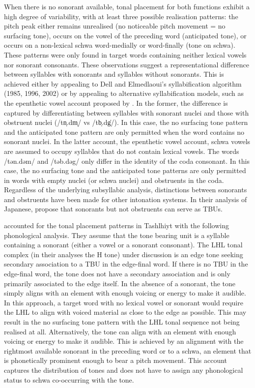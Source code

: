 When there is no sonorant available, tonal placement for both functions exhibit a high degree of variability, with at least three possible realisation patterns: the pitch peak either remains unrealised (no noticeable pitch movement = no surfacing tone), occurs on the vowel of the preceding word (anticipated tone), or occurs on a non-lexical schwa word-medially or word-finally (tone on schwa). These patterns were only found in target words containing neither lexical vowels nor sonorant consonants. These observations suggest a representational difference between syllables with sonorants and syllables without sonorants. This is achieved either by appealing to Dell and Elmedlaoui’s syllabification algorithm (1985, 1996, 2002) or by appealing to alternative syllabification models, such as the epenthetic vowel account proposed by \citet{Coleman2001}. In the former, the difference is captured by differentiating between syllables with sonorant nuclei and those with obstruent nuclei (/tn̩.dm̩/ vs /tb̩.dg̍/). In this case, the no surfacing tone pattern and the anticipated tone pattern are only permitted when the word contains no sonorant nuclei. In the latter account, the epenthetic vowel account, schwa vowels are assumed to occupy syllables that do not contain lexical vowels. The words /tən.dəm/ and /təb.dəg/ only differ in the identity of the coda consonant. In this case, the no surfacing tone and the anticipated tone patterns are only permitted in words with empty nuclei (or schwa nuclei) and obstruents in the coda. Regardless of the underlying subsyllabic analysis, distinctions between sonorants and obstruents have been made for other intonation systems. In their analysis of Japanese, \citet{PierrBeck1988} propose that sonorants but not obstruents can serve as TBUs.

\citet{Grice.etal2015tash} accounted for the tonal placement patterns in Tashlhiyt with the following phonological analysis. They assume that the tone bearing unit is a syllable containing a sonorant (either a vowel or a sonorant consonant). The LHL tonal complex (in their analyses the H tone) under discussion is an edge tone seeking secondary association to a TBU in the edge-final word. If there is no TBU in the edge-final word, the tone does not have a secondary association and is only primarily associated to the edge itself. In the absence of a sonorant, the tone simply aligns with an element with enough voicing or energy to make it audible. In this approach, a target word with no lexical vowel or sonorant would require the LHL to align with voiced material as close to the edge as possible. This may result in the no surfacing tone pattern with the LHL tonal sequence not being realised at all. Alternatively, the tone can align with an element with enough voicing or energy to make it audible. This is achieved by an alignment with the rightmost available sonorant in the preceding word or to a schwa, an element that is phonetically prominent enough to bear a pitch movement. This account captures the distribution of tones and does not have to assign any phonological status to schwa co-occurring with the tone. 

